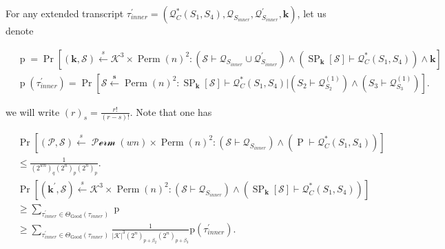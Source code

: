 For any extended transcript $\tau_{inner}^{\prime}=\left(\mathcal{Q}_{C}^{*}\left(S_{1}, S_{4}\right), \mathcal{Q}_{S_{inner}}, \mathcal{Q}_{S_{inner}}^{\prime}, \mathbf{k}\right)$, let us denote

$$
\begin{aligned}
&\operatorname{p} =  \operatorname{Pr}\left[\left(\mathbf{k}, \mathcal{S}\right) \stackrel{s}{\leftarrow} \mathcal{K}^{3} \times \operatorname{Perm}(n)^{2}:
\left(\mathcal{S} \vdash \mathcal{Q}_{S_{inner}} \cup \mathcal{Q}_{S_{inner}}^{\prime}\right) \wedge \left(\operatorname{SP}_{\mathbf{k}}[\mathcal{S}] \vdash \mathcal{Q}_{C}^{*}\left(S_{1},S_{4}\right)\right) \wedge\mathbf{k}\right]\\
&\operatorname{p}\left(\tau_{inner}^{\prime}\right) =\operatorname{Pr}\left[\mathcal{S} \stackrel{\mathbf{s}}{\leftarrow} \operatorname{Perm}(n)^{2}: \operatorname{SP}_{\mathbf{k}}[\mathcal{S}] \vdash \mathcal{Q}_{C}^{*}\left(S_{1},S_{4}\right) |\left(S_{2} \vdash \mathcal{Q}_{S_{2}}^{(1)}\right) \wedge\left(S_{3} \vdash \mathcal{Q}_{S_{3}}^{(1)}\right)\right].
\end{aligned}
$$

we will write $(r)_{s} = \frac{r!}{(r-s)!}$. Note that one has

$$
\begin{aligned}
&\operatorname{Pr}\left[(\mathcal{P}, \mathcal{S}) \stackrel{s}{\leftarrow} \mathcal{\operatorname{Perm}}(w n) \times \operatorname{Perm}(n)^{2}:\left(\mathcal{S} \vdash \mathcal{Q}_{S_{inner}}\right) \wedge\left(\operatorname{P} \vdash \mathcal{Q}_{C}^{*}\left(S_{1},S_{4}\right)\right)\right] \\
&\leq  \frac{1}{\left(2^{w n}\right)_{q}\left(2^{n}\right)_{p}\left(2^{n}\right)_{p}}. \\
&\operatorname{Pr}\left[(\mathbf{k}^{\prime}, \mathcal{S}) \stackrel{s}{\leftarrow} \mathcal{K}^{3} \times \operatorname{Perm}(n)^{2}:\left(\mathcal{S} \vdash \mathcal{Q}_{S_{inner}}\right) \wedge\left(\operatorname{SP}_{\mathbf{k}}[\mathcal{S}] \vdash \mathcal{Q}_{C}^{*}\left(S_{1},S_{4}\right)\right)\right] \\
& \geq \sum_{\tau_{inner}^{\prime} \in \Theta_{\mathrm{Good}}(\tau_{inner})} \operatorname{p}\\
&\geq \sum_{\tau_{inner}^{\prime} \in \Theta_{\mathrm{Good}}(\tau_{inner})} \frac{1}{|\mathcal{K}|^{3}\left(2^{n}\right)_{p+\beta_{2}}\left(2^{n}\right)_{p+\beta_{3}}} \mathrm{p}\left(\tau_{inner}^{\prime}\right).
\end{aligned}
$$

